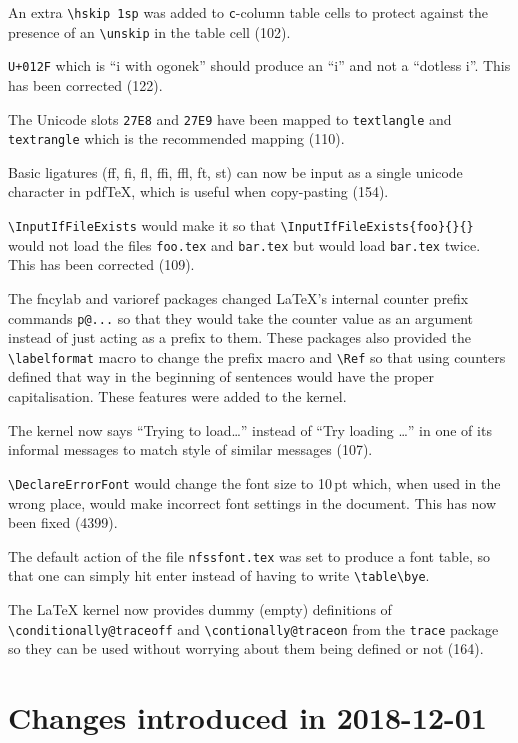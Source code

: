 \documentclass{ltxguide}
\newcommand\ghissue[1]{#1}
\newcommand\gnatsissue[1]{#1}
\newcommand\ghissue[1]{%
    \href{https://github.com/latex3/latex2e/issues/#1}{#1}}
\newcommand\gnatsissue[1]{%
    \href{https://www.latex-project.org/cgi-bin/ltxbugs2html?pr=latex/#1}{#1}}
\begin{document}
An extra \verb|\hskip 1sp| was added to \verb|c|-column table cells to
protect against the presence of an \verb|\unskip| in the table cell
(\ghissue{102}).

\texttt{U+012F} which is ``i with ogonek'' should produce an
``i'' and not a ``dotless i''. This has been corrected
(\ghissue{122}).

The Unicode slots \texttt{27E8} and \texttt{27E9} have been mapped to
\verb|textlangle| and \verb|textrangle| which is the recommended mapping
(\ghissue{110}).

Basic ligatures (ff, fi, fl, ffi, ffl, ft, st) can now be input as a
single unicode character in pdf\TeX, which is useful when copy-pasting
(\ghissue{154}).

\verb|\InputIfFileExists| would make it so that
\verb|\InputIfFileExists{foo}{}{}|
would not load the files \texttt{foo.tex} and \texttt{bar.tex} but
would load \texttt{bar.tex} twice. This has been corrected (\ghissue{109}).

The \textsf{fncylab} and \textsf{varioref} packages changed \LaTeX's internal
counter prefix commands \verb|p@...| so that they would take the counter
value as an argument instead of just acting as a prefix to them. These
packages also provided the \verb|\labelformat| macro to change the prefix
macro and \verb|\Ref| so that using counters defined that way in the
beginning of sentences would have the proper capitalisation. These features
were added to the \LaTeXe{} kernel.

The kernel now says ``Trying to load\ldots''
instead of ``Try loading \ldots'' in one of its informal
messages to match style of similar messages (\ghissue{107}).

\verb|\DeclareErrorFont| would change the font size to 10\,pt which, when
used in the wrong place, would make incorrect font settings in the document.
This has now been fixed (\gnatsissue{4399}).

The default action of the file \texttt{nfssfont.tex} was set to produce a
font table, so that one can simply hit enter instead of having to write
\verb=\table\bye=.

The \LaTeX{} kernel now provides dummy (empty) definitions of
\verb|\conditionally@traceoff| and \verb|\contionally@traceon| from the
\texttt{trace} package so they can be used without worrying about them
being defined or not (\ghissue{164}).





\section{Changes introduced in 2018-12-01}
\end{document}
